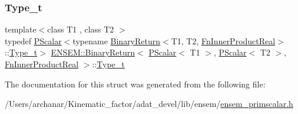 \mbox{\label{structENSEM_1_1BinaryReturn_3_01PScalar_3_01T1_01_4_00_01PScalar_3_01T2_01_4_00_01FnInnerProductReal_01_4_a20722f3bcaa8e004d4ff8dd5e7007fda}} 
\subsubsection{\texorpdfstring{Type\_t}{Type\_t}\hspace{0.1cm}{\footnotesize\ttfamily [2/2]}}
{\footnotesize\ttfamily template$<$class T1 , class T2 $>$ \\
typedef \mbox{\hyperlink{classENSEM_1_1PScalar}{P\+Scalar}}$<$typename \mbox{\hyperlink{structENSEM_1_1BinaryReturn}{Binary\+Return}}$<$T1, T2, \mbox{\hyperlink{structENSEM_1_1FnInnerProductReal}{Fn\+Inner\+Product\+Real}}$>$\+::\mbox{\hyperlink{structENSEM_1_1BinaryReturn_3_01PScalar_3_01T1_01_4_00_01PScalar_3_01T2_01_4_00_01FnInnerProductReal_01_4_a20722f3bcaa8e004d4ff8dd5e7007fda}{Type\+\_\+t}}$>$ \mbox{\hyperlink{structENSEM_1_1BinaryReturn}{E\+N\+S\+E\+M\+::\+Binary\+Return}}$<$ \mbox{\hyperlink{classENSEM_1_1PScalar}{P\+Scalar}}$<$ T1 $>$, \mbox{\hyperlink{classENSEM_1_1PScalar}{P\+Scalar}}$<$ T2 $>$, \mbox{\hyperlink{structENSEM_1_1FnInnerProductReal}{Fn\+Inner\+Product\+Real}} $>$\+::\mbox{\hyperlink{structENSEM_1_1BinaryReturn_3_01PScalar_3_01T1_01_4_00_01PScalar_3_01T2_01_4_00_01FnInnerProductReal_01_4_a20722f3bcaa8e004d4ff8dd5e7007fda}{Type\+\_\+t}}}



The documentation for this struct was generated from the following file\+:\begin{DoxyCompactItemize}
\item 
/\+Users/archanar/\+Kinematic\+\_\+factor/adat\+\_\+devel/lib/ensem/\mbox{\hyperlink{lib_2ensem_2ensem__primscalar_8h}{ensem\+\_\+primscalar.\+h}}\end{DoxyCompactItemize}

